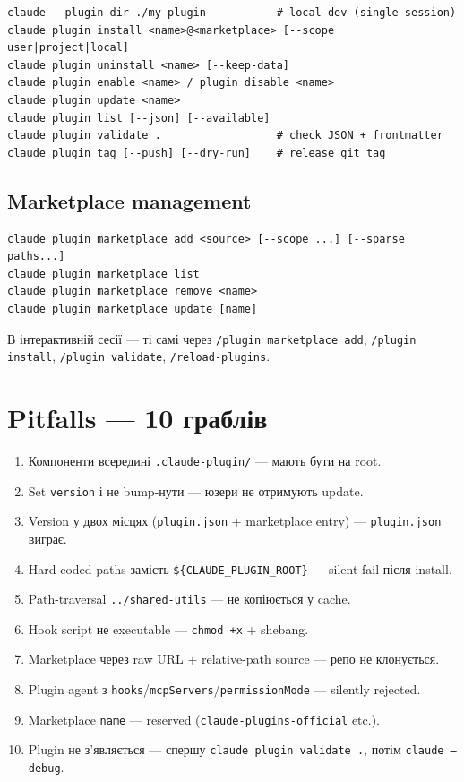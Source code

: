 \documentclass[11pt,a4paper]{article}
\begin{document}
\begin{lstlisting}
claude --plugin-dir ./my-plugin           # local dev (single session)
claude plugin install <name>@<marketplace> [--scope user|project|local]
claude plugin uninstall <name> [--keep-data]
claude plugin enable <name> / plugin disable <name>
claude plugin update <name>
claude plugin list [--json] [--available]
claude plugin validate .                  # check JSON + frontmatter
claude plugin tag [--push] [--dry-run]    # release git tag
\end{lstlisting}

\subsection{Marketplace management}

\begin{lstlisting}
claude plugin marketplace add <source> [--scope ...] [--sparse paths...]
claude plugin marketplace list
claude plugin marketplace remove <name>
claude plugin marketplace update [name]
\end{lstlisting}

В інтерактивній сесії --- ті самі через \texttt{/plugin marketplace add}, \texttt{/plugin install}, \texttt{/plugin validate}, \texttt{/reload-plugins}.

\section{Pitfalls --- 10 граблів}

\begin{enumerate}
\item Компоненти всередині \texttt{.claude-plugin/} --- мають бути на root.
\item Set \texttt{version} і не bump-нути --- юзери не отримують update.
\item Version у двох місцях (\texttt{plugin.json} + marketplace entry) --- \texttt{plugin.json} виграє.
\item Hard-coded paths замість \texttt{\$\{CLAUDE\_PLUGIN\_ROOT\}} --- silent fail після install.
\item Path-traversal \texttt{../shared-utils} --- не копіюється у cache.
\item Hook script не executable --- \texttt{chmod +x} + shebang.
\item Marketplace через raw URL + relative-path source --- репо не клонується.
\item Plugin agent з \texttt{hooks}/\texttt{mcpServers}/\texttt{permissionMode} --- silently rejected.
\item Marketplace \texttt{name} --- reserved (\texttt{claude-plugins-official} etc.).
\item Plugin не з'являється --- спершу \texttt{claude plugin validate .}, потім \texttt{claude --debug}.
\end{enumerate}
\end{document}
